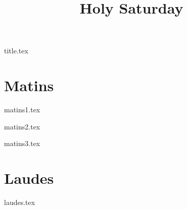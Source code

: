 \documentclass[statementpaper,10pt,openright,openbib]{memoir}
\title{Holy Saturday}
\begin{document}

{title.tex}

\frontmatter

\mainmatter

\chapter*{Matins}

{matins1.tex}

{matins2.tex}

{matins3.tex}

\chapter*{Laudes}

{laudes.tex}
\end{document}
